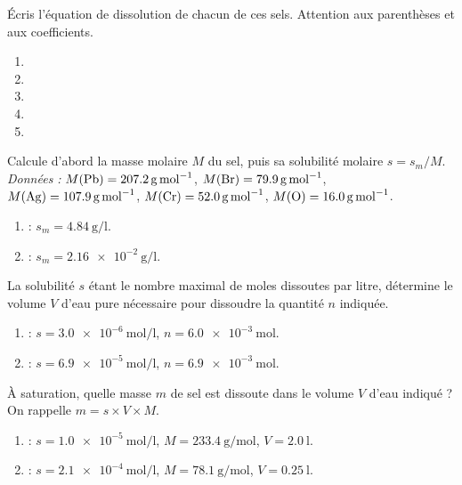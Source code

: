 \documentclass[11pt,a4paper]{article}
\begin{document}
\begin{exo}
Écris l'équation de dissolution de chacun de ces sels. Attention aux parenthèses et aux coefficients.
\begin{enumerate}[label=\alph*)]
  \item {}
  \item {}
  \item {}
  \item {}
  \item {}
\end{enumerate}
\end{exo}

\begin{exo}
Calcule d'abord la masse molaire $M$ du sel, puis sa solubilité molaire $s=s_m/M$.
\emph{Données :} $M(\ce{Pb})=\qty{207.2}{\gram\per\mole}$, $M(\ce{Br})=\qty{79.9}{\gram\per\mole}$,
$M(\ce{Ag})=\qty{107.9}{\gram\per\mole}$, $M(\ce{Cr})=\qty{52.0}{\gram\per\mole}$,
$M(\ce{O})=\qty{16.0}{\gram\per\mole}$.
\begin{enumerate}[label=\alph*)]
  \item {} : $s_m=\qty{4.84}{\gram\per\litre}$.
  \item {} : $s_m=\qty{2.16e-2}{\gram\per\litre}$.
\end{enumerate}
\end{exo}

\begin{exo}
La solubilité $s$ étant le nombre maximal de moles dissoutes par litre, détermine le volume $V$ d'eau
pure nécessaire pour dissoudre la quantité $n$ indiquée.
\begin{enumerate}[label=\alph*)]
  \item {} : $s=\qty{3.0e-6}{\mole\per\litre}$, $n=\qty{6.0e-3}{\mole}$.
  \item {} : $s=\qty{6.9e-5}{\mole\per\litre}$, $n=\qty{6.9e-3}{\mole}$.
\end{enumerate}
\end{exo}

\begin{exo}
À saturation, quelle masse $m$ de sel est dissoute dans le volume $V$ d'eau indiqué ?
On rappelle $m = s\times V\times M$.
\begin{enumerate}[label=\alph*)]
  \item {} : $s=\qty{1.0e-5}{\mole\per\litre}$, $M=\qty{233.4}{\gram\per\mole}$, $V=\qty{2.0}{\litre}$.
  \item {} : $s=\qty{2.1e-4}{\mole\per\litre}$, $M=\qty{78.1}{\gram\per\mole}$, $V=\qty{0.25}{\litre}$.
\end{enumerate}
\end{exo}
\end{document}
